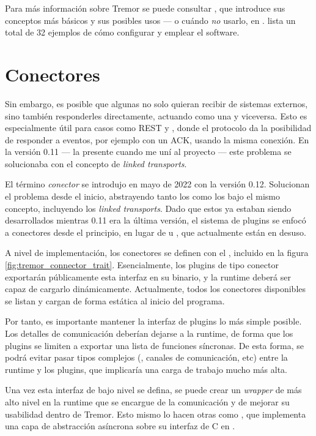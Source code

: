 Para más información sobre Tremor se puede consultar \textcite{tremorintro}, que
introduce sus conceptos más básicos y sus posibles usos --- o cuándo \emph{no}
usarlo, en \textcite{tremorconstraints}. \textcite{tremorrecipes} lista un total
de 32 ejemplos de cómo configurar y emplear el software.

\section{Conectores}

Sin embargo, es posible que algunas \onramps no solo quieran recibir de sistemas
externos, sino también responderles directamente, actuando como una \offramp y
viceversa. Esto es especialmente útil para casos como REST y \websockets, donde
el protocolo da la posibilidad de responder a eventos, por ejemplo con un ACK,
usando la misma conexión. En la versión 0.11 --- la presente cuando me uní al
proyecto --- este problema se solucionaba con el concepto de \emph{linked
transports}.

El término \emph{conector} se introdujo en mayo de 2022 con la versión 0.12.
Solucionan el problema desde el inicio, abstrayendo tanto los \onramps como los
\offramps bajo el mismo concepto, incluyendo los \emph{linked transports}. Dado
que estos ya estaban siendo desarrollados mientras 0.11 era la última versión,
el sistema de plugins se enfocó a conectores desde el principio, en lugar de
\onramps u \offramps, que actualmente están en desuso.

A nivel de implementación, los conectores se definen con el \trait
{}, incluido en la figura \ref{fig:tremor_connector_trait}.
Esencialmente, los plugins de tipo conector exportarán públicamente esta
interfaz en su binario, y la runtime deberá ser capaz de cargarlo dinámicamente.
Actualmente, todos los conectores disponibles se listan y cargan de forma
estática al inicio del programa.

Por tanto, es importante mantener la interfaz de plugins lo más simple posible.
Los detalles de comunicación deberían dejarse a la runtime, de forma que los
plugins se limiten a exportar una lista de funciones síncronas. De esta forma,
se podrá evitar pasar tipos complejos (, canales de comunicación,
etc) entre la runtime y los plugins, que implicaría una carga de trabajo mucho
más alta.

Una vez esta interfaz de bajo nivel se defina, se puede crear un \emph{wrapper}
de más alto nivel en la runtime que se encargue de la comunicación y de mejorar
su usabilidad dentro de Tremor. Esto mismo lo hacen otras \crates como
, que implementa una capa de abstracción asíncrona sobre su
interfaz de C en .
